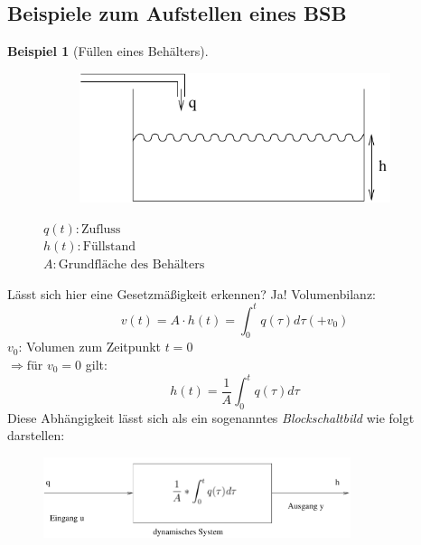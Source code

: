 \documentclass[12pt,a4paper,ngerman]{scrartcl}
\newtheorem{bsp}{Beispiel}[section] %
\begin{document}
\subsection{Beispiele zum Aufstellen eines BSB}
\begin{bsp}[Füllen eines Behälters]
\end{bsp}
\begin{figure}[H]%
\begin{minipage}{0.4\linewidth} 
 \begin{figure}[H]
  \includegraphics[width=\linewidth]{sysregel_bsp_1} 
  \end{figure}
\end{minipage}
\begin{minipage}{.6\linewidth}
$q(t):\text{Zufluss}$\\
$h(t):\text{Füllstand}$\\
$A:\text{Grundfläche des Behälters}$
\end{minipage}
\end{figure}
Lässt sich hier eine Gesetzmäßigkeit erkennen? Ja! Volumenbilanz:
\begin{equation*}
 v(t)= A \cdot h(t)=\int_0^t{q(\tau)d\tau}(+v_0) 
\end{equation*}
$v_0$: Volumen zum Zeitpunkt $t=0$ \\$\Rightarrow \text{für } v_0 = 0$ gilt:
\begin{equation*}
h(t)=\frac{1}{A}\int_0^t{q(\tau)d\tau}
\end{equation*}
Diese Abhängigkeit lässt sich als ein sogenanntes \emph{Blockschaltbild} wie folgt darstellen:
\begin{figure}[H]
\includegraphics[width=9cm]{sysregel_bsb1}
\end{figure}
\end{document}
